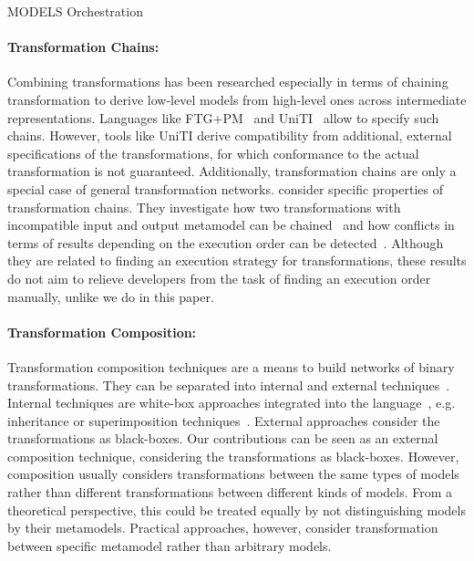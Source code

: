 \begin{copiedFrom}{MODELS Orchestration}
\paragraph{Transformation Chains:}
Combining transformations has been researched especially in terms of chaining transformation to derive low-level models from high-level ones across intermediate representations.
Languages like FTG+PM~\cite{lucio2013FTGPM-SDL} and UniTI~\cite{vanhooff2007UniTI-MODELS} allow to specify such chains.
However, tools like UniTI derive compatibility from additional, external specifications of the transformations, for which conformance to the actual transformation is not guaranteed.
Additionally, transformation chains are only a special case of general transformation networks. %
 consider specific properties of transformation chains.
They investigate how two transformations with incompatible input and output metamodel can be chained~\cite{etien2010Combining-SAC} and how conflicts in terms of results depending on the execution order can be detected~\cite{etien2012Chaining-AMT}.
Although they are related to finding an execution strategy for transformations, these results do not aim to relieve developers from the task of finding an execution order manually, unlike we do in this paper.

\paragraph{Transformation Composition:}
Transformation composition techniques are a means to build networks of binary transformations.
They can be separated into internal and external techniques~\cite{wagelaar2008a}.
Internal techniques are white-box approaches integrated into the language~\cite{wagelaar2011a}, e.g. inheritance or superimposition techniques~\cite{wagelaar2010a}.
External approaches consider the transformations as black-boxes. %
Our contributions can be seen as an external composition technique, considering the transformations as black-boxes.
However, composition usually considers transformations between the same types of models rather than different transformations between different kinds of models.
From a theoretical perspective, this could be treated equally by not distinguishing models by their metamodels. Practical approaches, however, consider transformation between specific metamodel rather than arbitrary models.


\end{copiedFrom}

